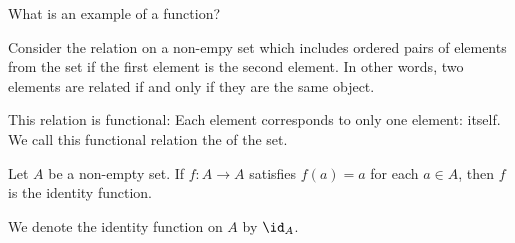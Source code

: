 
\sbasic




\sstart



What is an example
of a function?


Consider the relation on
a non-empy set which includes
ordered pairs of elements
from the set if the first
element is the second element.
In other words, two elements
are related if and only if
they are the same object.

This relation is functional:
Each element corresponds to
only one element: itself.
We call this functional relation
the
of the set.


Let $A$ be a non-empty set.
If $f: A \to A$ satisfies
$f(a) = a$ for each $a \in A$,
  then $f$ is the identity function.

We denote the identity
function on $A$ by $\id_A$.

\strats
